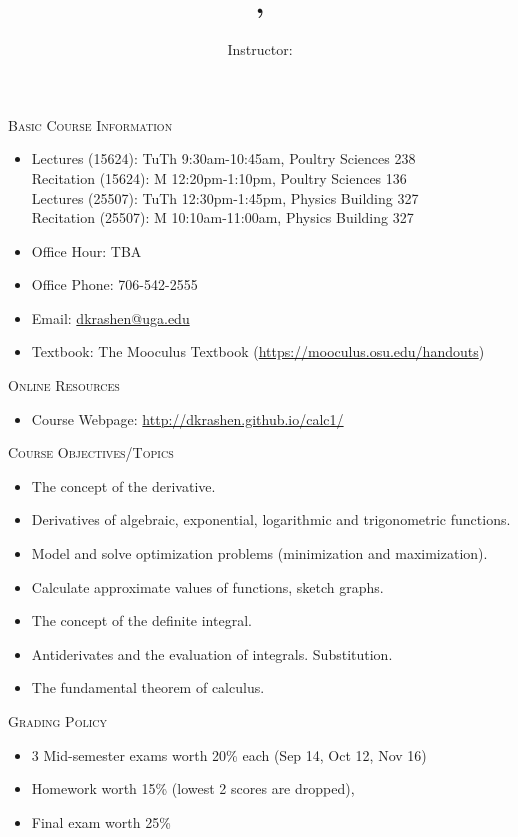 \documentclass[12pt]{amsart}
\title{\course, \semester}
\author{Instructor: \instructor}
\makeatletter
\newcommand{\schedule}{
Lectures (15624): TuTh 9:30am-10:45am, Poultry Sciences 238 \\
Recitation (15624): M 12:20pm-1:10pm, Poultry Sciences 136 \\
Lectures (25507): TuTh 12:30pm-1:45pm, Physics Building 327 \\
Recitation (25507): M 10:10am-11:00am, Physics Building 327
}
\newcommand{\officehour}{Office Hour: TBA}
\newcommand{\phone}{706-542-2555}
\newcommand{\emailaddr}{dkrashen@uga.edu}
\newcommand{\textbook}{{The Mooculus Textbook}
(\url{https://mooculus.osu.edu/handouts})}
\newcommand{\website}{http://dkrashen.github.io/calc1/}
\makeatother
\begin{document}
\maketitle


\thispagestyle{empty}
\noindent
\textsc{Basic Course Information}

\begin{itemize}
\item
\schedule
\item 
\officehour
\item
Office Phone: \phone
\item
Email: \url{\emailaddr}
\item
Textbook: \textbook
\end{itemize}

\medskip

\noindent
\textsc{Online Resources}

\begin{itemize}
\item
Course Webpage:  
\url{\website} 
\end{itemize}

\medskip

\noindent
\textsc{Course Objectives/Topics}

\begin{itemize}
\item
The concept of the derivative.
\item
Derivatives of algebraic, exponential, logarithmic and trigonometric
functions.
\item
Model and solve optimization problems (minimization and
maximization).
\item
Calculate approximate values of functions, sketch graphs.
\item
The concept of the definite integral.
\item
Antiderivates and the evaluation of integrals. Substitution. 
\item
The fundamental theorem of calculus.
\end{itemize}

\medskip

\noindent
\textsc{Grading Policy}

\begin{itemize}
\item
3 Mid-semester exams worth 20\% each (Sep 14, Oct 12, Nov 16)
\item
Homework worth 15\% (lowest 2 scores are dropped), 
\item
Final exam worth 25\% 
\end{itemize}
\end{document}
